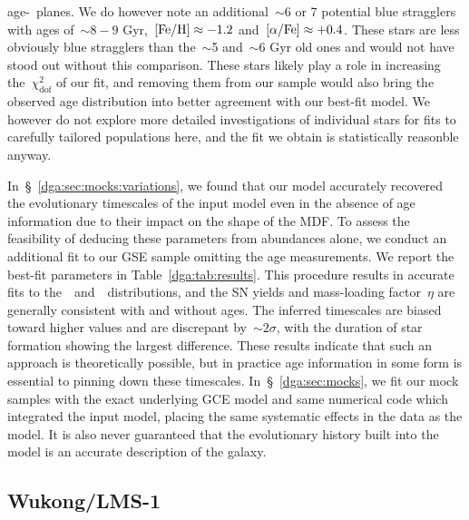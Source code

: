 age-\afe~planes.
We do however note an additional~$\sim$6 or 7 potential blue stragglers with
ages of~$\sim$$8 - 9$ Gyr,~$\text{[Fe/H]} \approx -1.2$ and~$\text{[$\alpha$/Fe]} \approx +0.4$.
These stars are less obviously blue stragglers than the~$\sim$5 and~$\sim$6 Gyr
old ones and would not have stood out without this comparison.
These stars likely play a role in increasing the~$\chi_\text{dof}^2$ of our
fit, and removing them from our sample would also bring the observed age
distribution into better agreement with our best-fit model.
We however do not explore more detailed investigations of individual stars for
fits to carefully tailored populations here, and the fit we obtain is
statistically reasonble anyway.
\par
In~\S~\ref{dga:sec:mocks:variations}, we found that our model accurately recovered
the evolutionary timescales of the input model even in the absence of age
information due to their impact on the shape of the MDF.
To assess the feasibility of deducing these parameters from abundances alone,
we conduct an additional fit to our GSE sample omitting the age measurements.
We report the best-fit parameters in Table~\ref{dga:tab:results}.
This procedure results in accurate fits to the~\feh~and~\afe~distributions, and
the SN yields and mass-loading factor~$\eta$ are generally consistent with
and without ages.
The inferred timescales are biased toward higher values and are discrepant
by~$\sim$$2\sigma$, with the duration of star formation showing the largest
difference.
These results indicate that such an approach is theoretically possible, but in
practice age information in some form is essential to pinning down these
timescales.
In~\S~\ref{dga:sec:mocks}, we fit our mock samples with the exact underlying GCE
model and same numerical code which integrated the input model, placing the
same systematic effects in the data as the model.
It is also never guaranteed that the evolutionary history built into the model
is an accurate description of the galaxy.

\subsection{Wukong/LMS-1}
\label{dga:sec:h3:wukong}

